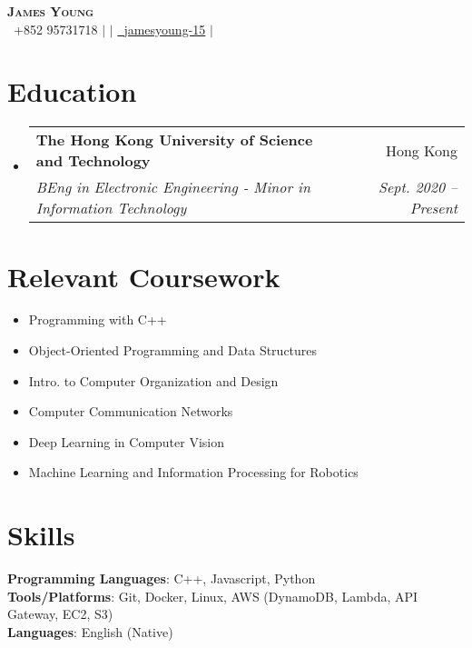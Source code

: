 \documentclass[letterpaper,12pt]{article}
\makeatletter
\newcommand{\resumeSubheading}[4]{
  \vspace{-2pt}\item
    \begin{tabular*}{0.97\textwidth}[t]{l@{\extracolsep{\fill}}r}
      \textbf{#1} & #2 \\
      \textit{\small#3} & \textit{\small #4} \\
    \end{tabular*}\vspace{-7pt}
}
\newcommand{\resumeSubHeadingListStart}{\begin{itemize}[leftmargin=0.05in, label={}]}
\newcommand{\resumeSubHeadingListEnd}{\end{itemize}}
\makeatother
\begin{document}
\begin{center}
    \textbf{\Huge \scshape James Young} \\ \vspace{2pt}
    \small  \faPhone\ {+852 95731718} $|$ 
    \href{mailto:jyyoungaa@connect.ust.hk}{} $|$ 
    \href{https://github.com/jamesyoung-15} {\faGithub\ {jamesyoung-15}} $|$
    \href{https://linkedin.com/in/jamesyyoung}{}
\end{center}


\section{Education}
  \resumeSubHeadingListStart
    \resumeSubheading
      {The Hong Kong University of Science and Technology}{Hong Kong}
      {BEng in Electronic Engineering - Minor in Information Technology}{Sept. 2020 -- Present}
  \resumeSubHeadingListEnd

\section{Relevant Coursework}
\vspace{-12pt}
    \begin{multicols}{2}
        \begin{itemize}[itemsep=-1pt, parsep=3pt]
        \footnotesize
            \item Programming with C++
            \item Object-Oriented Programming and Data Structures
            \item Intro. to Computer Organization and Design
            \item Computer Communication Networks
            \item Deep Learning in Computer Vision
            \item Machine Learning and Information Processing for Robotics
        \end{itemize}
    \end{multicols}

\vspace{-25pt}
\section{Skills}
 \begin{itemize}[leftmargin=0.15in, label={}]
    \small{\item{
     \textbf{Programming Languages}{: C++, Javascript, Python} \\
     \textbf{Tools/Platforms}{: Git, Docker, Linux, AWS (DynamoDB, Lambda, API Gateway, EC2, S3)} \\
     \textbf{Languages}{: English (Native)} \\
    }}
 \end{itemize}
\end{document}
